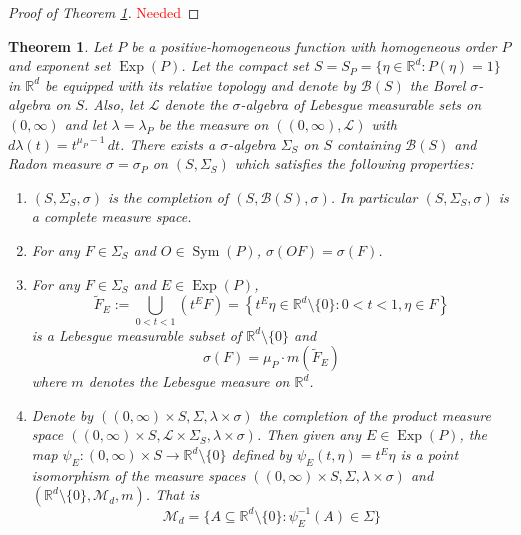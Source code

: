 \documentclass[11pt]{article}
\theoremstyle{theorem}
\newtheorem{theorem}{Theorem}[section]
\newcommand\Sym{\operatorname{Sym}}
\newcommand\Exp{\operatorname{Exp}}
\begin{document}
\begin{proof}[Proof of Theorem \ref{thm:BestIntegrationFormula}]
\textcolor{red}{Needed}
\end{proof}

\begin{theorem}\label{thm:BestIntegrationFormula}
Let $P$ be a positive-homogeneous function with homogeneous order $P$ and exponent set $\Exp(P)$. Let the compact set $S=S_P=\{\eta\in\mathbb{R}^d:P(\eta)=1\}$ in $\mathbb{R}^d$ be equipped with its relative topology and denote by $\mathcal{B}(S)$ the Borel $\sigma$-algebra on $S$. Also, let $\mathcal{L}$ denote the $\sigma$-algebra of Lebesgue measurable sets on $(0,\infty)$ and let $\lambda=\lambda_P$ be the measure on $((0,\infty),\mathcal{L})$ with $d\lambda(t)=t^{\mu_P-1}\,dt$. There exists a $\sigma$-algebra $\Sigma_S$ on $S$ containing $\mathcal{B}(S)$ and Radon measure $\sigma=\sigma_P$ on $(S,\Sigma_S)$ which satisfies the following properties:
\begin{enumerate}
\item $(S,\Sigma_S,\sigma)$ is the completion of $(S,\mathcal{B}(S),\sigma)$. In particular $(S,\Sigma_S,\sigma)$ is a complete measure space.
\item For any $F\in\Sigma_S$ and $O\in\Sym(P)$, $\sigma(OF)=\sigma(F)$.
\item For any $F\in\Sigma_S$ and $E\in\Exp(P)$, 
\begin{equation*}
\widetilde{F}_E:=\bigcup_{0<t<1}\left(t^E F\right)=\left\{t^E\eta\in\mathbb{R}^d\setminus\{0\}:0<t<1,\eta\in F\right\}
\end{equation*}
is a Lebesgue measurable subset of $\mathbb{R}^d\setminus \{0\}$ and
\begin{equation*}
\sigma(F)=\mu_P\cdot m\left(\widetilde{F}_E\right)
\end{equation*}
where $m$ denotes the Lebesgue measure on $\mathbb{R}^d$.
\item Denote by $((0,\infty)\times S,\Sigma,\lambda\times\sigma)$ the completion of the product measure space $((0,\infty)\times S,\mathcal{L}\times \Sigma_S,\lambda\times\sigma)$. Then given any $E\in \Exp(P)$, the map $\psi_E:(0,\infty)\times S\to\mathbb{R}^d\setminus\{0\}$ defined by $\psi_E(t,\eta)=t^E\eta$ is a point isomorphism of the measure spaces $((0,\infty)\times S,\Sigma,\lambda\times\sigma)$ and $(\mathbb{R}^d\setminus\{0\},\mathcal{M}_d,m)$. That is
\begin{equation*}
\mathcal{M}_d=\{A\subseteq \mathbb{R}^d\setminus\{0\}:\psi_E^{-1}(A)\in\Sigma\}
\end{equation*}

\end{enumerate}
\end{theorem}
\end{document}
